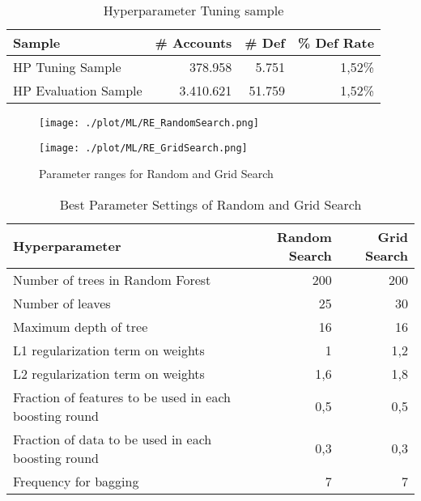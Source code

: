 \begin{table}[H]
\centering
\begin{tabular}{lrrr} \toprule
\textbf{Sample}      & \textbf{\# Accounts} & \textbf{\# Def} & \textbf{\% Def Rate} \\\midrule
HP Tuning Sample     & 378.958               & 5.751            & 1,52\%               \\
HP Evaluation Sample & 3.410.621              & 51.759           & 1,52\%           \\\bottomrule   
\end{tabular}
\caption{Hyperparameter Tuning sample}
\label{re_hptunsample}
\end{table}

\begin{figure}[H]
\begin{minipage}{.7\textwidth}
	\centering
	\texttt{[image: ./plot/ML/RE\_RandomSearch.png]}
\end{minipage}%
\begin{minipage}{.3\textwidth}
	\centering
	\texttt{[image: ./plot/ML/RE\_GridSearch.png]}
\end{minipage}
    \caption{Parameter ranges for Random and Grid Search}
    \label{fig:re_hpsearch}
\end{figure}

\begin{table}[H]
\centering
\begin{tabular}{lrr}\toprule
\textbf{Hyperparameter}                                & \textbf{Random Search} & \textbf{Grid Search} \\\midrule
Number of trees in Random Forest                       & 200                                & 200                              \\
Number of leaves                                       & 25                                 & 30                               \\
Maximum depth of tree                                  & 16                                 & 16                               \\
L1 regularization term on weights                      & 1                                  & 1,2                              \\
L2 regularization term on weights                      & 1,6                                & 1,8                              \\
Fraction of features to be used in each boosting round & 0,5                                & 0,5                              \\
Fraction of data to be used in each boosting round     & 0,3                                & 0,3                              \\
Frequency for bagging                                  & 7                                  & 7                               \\\bottomrule
\end{tabular}
\caption{Best Parameter Settings of Random and Grid Search}
\label{tab:best_rand_grid}
\end{table}

